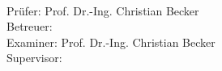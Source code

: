 
\begin{titlepage}
\setlength{\voffset}{-1cm}
\setlength{\footskip}{0pt}

\vspace*{16cm}

\begin{flushright}
\VornameDesStudenten \ \NachnameDesStudenten \\[0.3cm]
\Matrikelnummer \\[0.3cm]
\Studiengang \\ [0.3cm]
\ArtDerArbeit \\[0.3cm]
\IEETNumber \\[0.3cm]
\Abgabe \\[0.3cm]
				{
Prüfer: Prof. Dr.-Ing. Christian Becker \\[0.3cm]
Betreuer: \BetreuerE {} \\[0.3cm]}
{
Examiner: Prof. Dr.-Ing. Christian Becker \\[0.3cm]
Supervisor: \BetreuerE {}
}
\end{flushright}
\end{titlepage}